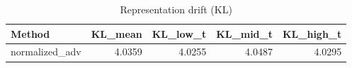 \begin{table}[htbp]
\centering
\caption{Representation drift (KL)}
\label{tab:repr-drift}
\begin{tabular}{lrrrr}
\toprule
\textbf{Method} & \textbf{KL\_mean} & \textbf{KL\_low\_t} & \textbf{KL\_mid\_t} & \textbf{KL\_high\_t} \\
\midrule
normalized\_adv & 4.0359 & 4.0255 & 4.0487 & 4.0295 \\
\bottomrule
\end{tabular}
\end{table}